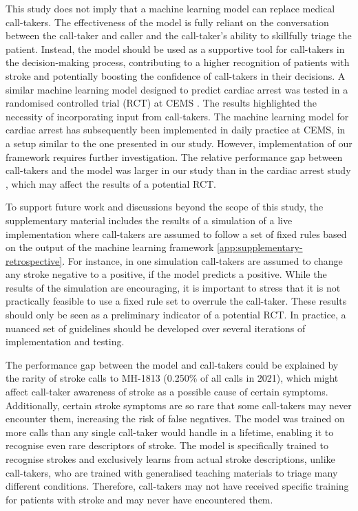 {This study does not imply that a machine learning model can replace medical call-takers. The effectiveness of the model is fully reliant on the conversation between the call-taker and caller and the call-taker's ability to skillfully triage the patient. Instead, the model should be used as a supportive tool for call-takers in the decision-making process, contributing to a higher recognition of patients with stroke and potentially boosting the confidence of call-takers in their decisions. A similar machine learning model designed to predict cardiac arrest was tested in a randomised controlled trial (RCT) at CEMS \parencite{cite15}. The results highlighted the necessity of incorporating input from call-takers. The machine learning model for cardiac arrest has subsequently been implemented in daily practice at CEMS, in a setup similar to the one presented in our study. However, implementation of our framework requires further investigation. The relative performance gap between call-takers and the model was larger in our study than in the cardiac arrest study \parencite{cite15}, which may affect the results of a potential RCT. 

To support future work and discussions beyond the scope of this study, the supplementary material includes the results of a simulation of a live implementation where call-takers are assumed to follow a set of fixed rules based on the output of the machine learning framework \cref{app:supplementary-retrospective}. For instance, in one simulation call-takers are assumed to change any stroke negative to a positive, if the model predicts a positive. While the results of the simulation are encouraging, it is important to stress that it is not practically feasible to use a fixed rule set to overrule the call-taker. These results should only be seen as a preliminary indicator of a potential RCT. In practice, a nuanced set of guidelines should be developed over several iterations of implementation and testing.

The performance gap between the model and call-takers could be explained by the rarity of stroke calls to MH-1813 (0.250\% of all calls in 2021), which might affect call-taker awareness of stroke as a possible cause of certain symptoms. Additionally, certain stroke symptoms are so rare that some call-takers may never encounter them, increasing the risk of false negatives. The model was trained on more calls than any single call-taker would handle in a lifetime, enabling it to recognise even rare descriptors of stroke. The model is specifically trained to recognise strokes and exclusively learns from actual stroke descriptions, unlike call-takers, who are trained with generalised teaching materials to triage many different conditions. Therefore, call-takers may not have received specific training for patients with stroke and may never have encountered them. 

}
